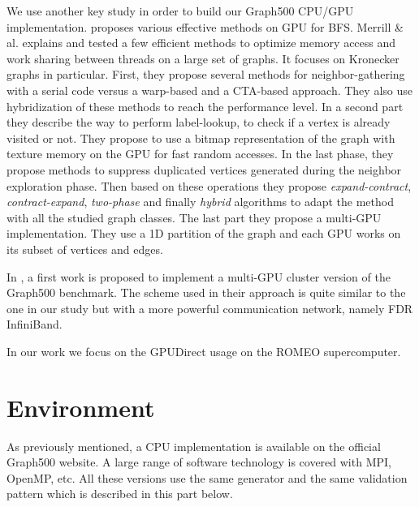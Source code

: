 We use another key study in order to build our Graph500 CPU/GPU implementation. 
\cite{merrill2015high} proposes various effective methods on GPU for BFS. 
Merrill \& al. explains and tested a few efficient methods to optimize memory access and work sharing between threads on a large set of graphs. 
It focuses on Kronecker graphs in particular. 
First, they propose several methods for neighbor-gathering with a serial code versus a warp-based and a CTA-based approach. 
They also use hybridization of these methods to reach the performance level. 
In a second part they describe the way to perform label-lookup, to check if a vertex is already visited or not. 
They propose to use a bitmap representation of the graph with texture memory on the GPU for fast random accesses. 
In the last phase, they propose methods to suppress duplicated vertices generated during the neighbor exploration phase. 
Then based on these operations they propose \textit{expand-contract}, \textit{contract-expand}, \textit{two-phase} and finally \textit{hybrid} algorithms to adapt the method with all the studied graph classes.
The last part they propose a multi-GPU implementation.
They use a 1D partition of the graph and each GPU works on its subset of vertices and edges. 

In \cite{fu2014parallel}, a first work is proposed to implement a multi-GPU cluster version of the Graph500 benchmark. 
The scheme used in their approach is quite similar to the one in our study but with a more powerful communication network, namely FDR InfiniBand. 

In our work we focus on the GPUDirect usage on the ROMEO supercomputer. 

\section{Environment}
As previously mentioned, a CPU implementation is available on the official Graph500 website. 
A large range of software technology is covered with MPI, OpenMP, etc. 
All these versions use the same generator and the same validation pattern which is described in this part below. 

